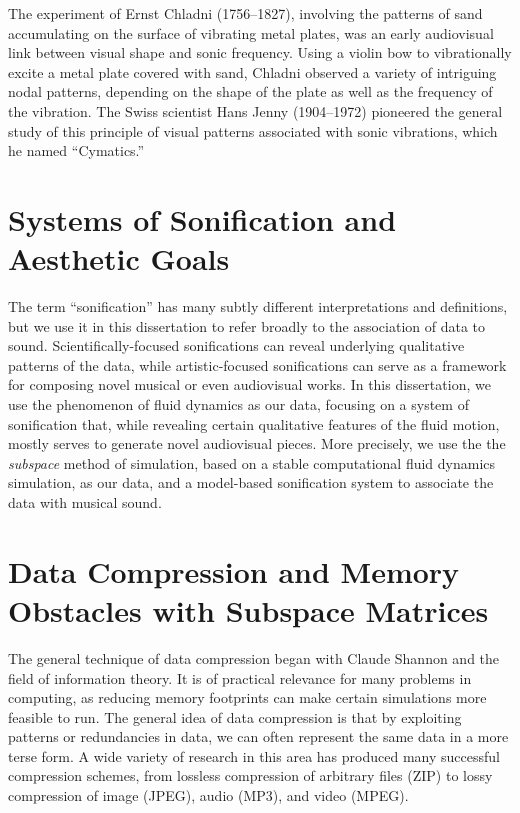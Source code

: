 The experiment of Ernst Chladni (1756--1827), involving the patterns of sand accumulating on the surface of vibrating metal plates, was an early audiovisual link between visual shape and sonic frequency. Using a violin bow to vibrationally excite a metal plate covered with sand, Chladni observed a variety of intriguing nodal patterns, depending on the shape of the plate as well as the frequency of the vibration. The Swiss scientist Hans Jenny (1904--1972) pioneered the general study of this principle of visual patterns associated with sonic vibrations, which he named ``Cymatics.'' 

\section{Systems of Sonification and Aesthetic Goals}
The term ``sonification'' has many subtly different interpretations and definitions, but we use it in this dissertation to refer broadly to the association of data to sound. Scientifically-focused sonifications can reveal underlying
qualitative patterns of the data, while artistic-focused sonifications can serve as a framework for composing novel musical or even audiovisual works. In this dissertation, we use the phenomenon of fluid dynamics as our
data, focusing on a system of sonification that, while revealing certain qualitative features of the fluid motion, mostly serves to generate novel audiovisual pieces. More precisely, we use the the {\em subspace} method of simulation, based on a stable computational fluid dynamics simulation, as our data, and a model-based sonification system to associate the data with musical sound. 

\section{Data Compression and Memory Obstacles with Subspace Matrices}
The general technique of data compression began with Claude Shannon and the field of information theory. It is of practical relevance for many problems in computing, as reducing memory footprints
can make certain simulations more feasible to run. The general idea of data compression is that by exploiting patterns or redundancies in data, we can often represent the same data in a more terse form.
A wide variety of research in this area has produced many successful compression schemes, from lossless compression of arbitrary files (ZIP) to lossy compression of image (JPEG), audio (MP3), and video (MPEG).

